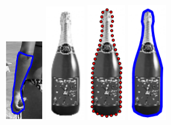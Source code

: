 \begin{figure}[ht]
    \hfill
    \includegraphics[width=0.15\textwidth]{resources/Annotation_Correction/Fig_Intro/intro_2_2}
    \hfill
    \includegraphics[width=0.15\textwidth]{resources/Annotation_Correction/Fig_Intro/intro_2_3}
    \hfill
    \includegraphics[width=0.15\textwidth]{resources/Annotation_Correction/Fig_Intro/intro_2_4}
    \hfill
    \includegraphics[width=0.15\textwidth]{resources/Annotation_Correction/Fig_Intro/intro_2_5}

\end{figure}
